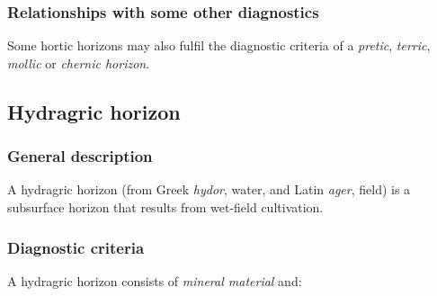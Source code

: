 \documentclass[
  letterpaper,
  DIV=11,
  numbers=noendperiod]{scrreprt}
\begin{document}
\hypertarget{relationships-with-some-other-diagnostics-15}{%
\subsubsection{Relationships with some other
diagnostics}\label{relationships-with-some-other-diagnostics-15}}

Some hortic horizons may also fulfil the diagnostic criteria of a
\emph{pretic}, \emph{terric}, \emph{mollic} or \emph{chernic horizon}.

\hypertarget{hydragric-horizon}{%
\subsection{Hydragric horizon}\label{hydragric-horizon}}

\hypertarget{general-description-16}{%
\subsubsection{General description}\label{general-description-16}}

A hydragric horizon (from Greek \emph{hydor}, water, and Latin
\emph{ager}, field) is a subsurface horizon that results from wet-field
cultivation.

\hypertarget{diagnostic-criteria-16}{%
\subsubsection{Diagnostic criteria}\label{diagnostic-criteria-16}}

A hydragric horizon consists of \emph{mineral material} and:
\end{document}
